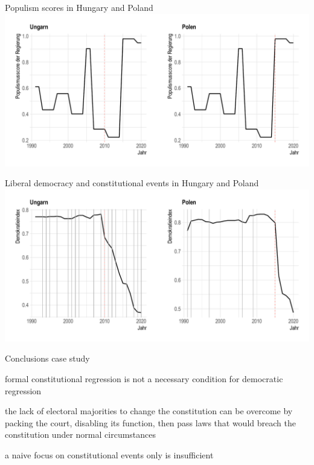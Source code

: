 \documentclass[xcolor=dvipsnames,aspectratio=169,12pt]{beamer}
\begin{document}
\begin{frame}{Populism scores in Hungary and Poland}
    \includegraphics[width=1\textwidth]{fig/populboth}
\end{frame}

\begin{frame}{Liberal  democracy and constitutional events in Hungary and Poland}
    \includegraphics[width=1\textwidth]{fig/libdemboth}
\end{frame}

\begin{frame}{Conclusions case study}
\begin{wideitemize}
    \item formal constitutional regression is not a necessary condition for democratic regression
    \item the lack of electoral majorities to change the constitution can be overcome by packing the court, disabling its function, then pass laws that would breach the constitution under normal circumstances
    \item a naive focus on constitutional events only is insufficient
\end{wideitemize} 
\end{frame}
\end{document}
